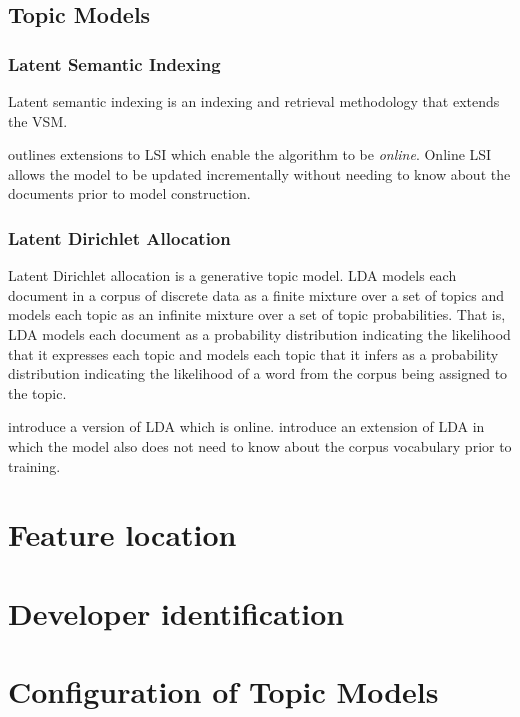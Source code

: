 \documentclass[12pt,draft]{Manuscript}
\begin{document}
\begin{body}
\subsection{Topic Models}\label{topic-models}

\subsubsection{Latent Semantic Indexing}\label{latent-semantic-indexing}

Latent semantic indexing \citep{Deerwester-etal:1990} is an indexing and
retrieval methodology that extends the VSM.

\citet{Rehurek:2011} outlines extensions to LSI which enable the
algorithm to be \emph{online}. Online LSI allows the model to be updated
incrementally without needing to know about the documents prior to model
construction.

\subsubsection{Latent Dirichlet
Allocation}\label{latent-dirichlet-allocation}

Latent Dirichlet allocation \citep{Blei-etal:2003} is a generative topic
model. LDA models each document in a corpus of discrete data as a finite
mixture over a set of topics and models each topic as an infinite
mixture over a set of topic probabilities. That is, LDA models each
document as a probability distribution indicating the likelihood that it
expresses each topic and models each topic that it infers as a
probability distribution indicating the likelihood of a word from the
corpus being assigned to the topic.

\citet{Hoffman-etal:2010} introduce a version of LDA which is online.
\citet{Zhai-Boyd-Graber:2013} introduce an extension of LDA in which the
model also does not need to know about the corpus vocabulary prior to
training.

\section{Feature location}\label{related-flt}

\section{Developer identification}\label{related-triage}

\section{Configuration of Topic Models}\label{related-config}


\end{body}
\end{document}
